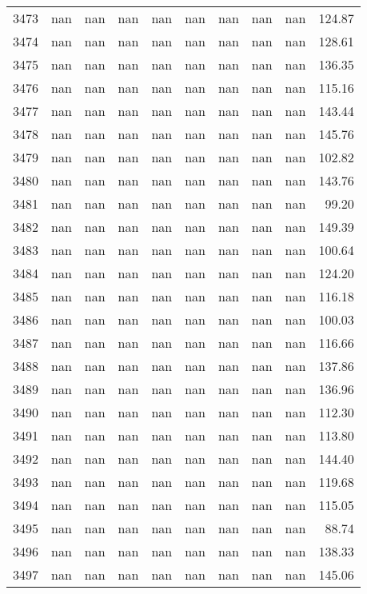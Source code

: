 \begin{tabular}{lrrrrrrrrr}
3473 & nan & nan & nan & nan & nan & nan & nan & nan & 124.87 \\
3474 & nan & nan & nan & nan & nan & nan & nan & nan & 128.61 \\
3475 & nan & nan & nan & nan & nan & nan & nan & nan & 136.35 \\
3476 & nan & nan & nan & nan & nan & nan & nan & nan & 115.16 \\
3477 & nan & nan & nan & nan & nan & nan & nan & nan & 143.44 \\
3478 & nan & nan & nan & nan & nan & nan & nan & nan & 145.76 \\
3479 & nan & nan & nan & nan & nan & nan & nan & nan & 102.82 \\
3480 & nan & nan & nan & nan & nan & nan & nan & nan & 143.76 \\
3481 & nan & nan & nan & nan & nan & nan & nan & nan & 99.20 \\
3482 & nan & nan & nan & nan & nan & nan & nan & nan & 149.39 \\
3483 & nan & nan & nan & nan & nan & nan & nan & nan & 100.64 \\
3484 & nan & nan & nan & nan & nan & nan & nan & nan & 124.20 \\
3485 & nan & nan & nan & nan & nan & nan & nan & nan & 116.18 \\
3486 & nan & nan & nan & nan & nan & nan & nan & nan & 100.03 \\
3487 & nan & nan & nan & nan & nan & nan & nan & nan & 116.66 \\
3488 & nan & nan & nan & nan & nan & nan & nan & nan & 137.86 \\
3489 & nan & nan & nan & nan & nan & nan & nan & nan & 136.96 \\
3490 & nan & nan & nan & nan & nan & nan & nan & nan & 112.30 \\
3491 & nan & nan & nan & nan & nan & nan & nan & nan & 113.80 \\
3492 & nan & nan & nan & nan & nan & nan & nan & nan & 144.40 \\
3493 & nan & nan & nan & nan & nan & nan & nan & nan & 119.68 \\
3494 & nan & nan & nan & nan & nan & nan & nan & nan & 115.05 \\
3495 & nan & nan & nan & nan & nan & nan & nan & nan & 88.74 \\
3496 & nan & nan & nan & nan & nan & nan & nan & nan & 138.33 \\
3497 & nan & nan & nan & nan & nan & nan & nan & nan & 145.06 \\

\end{tabular}
